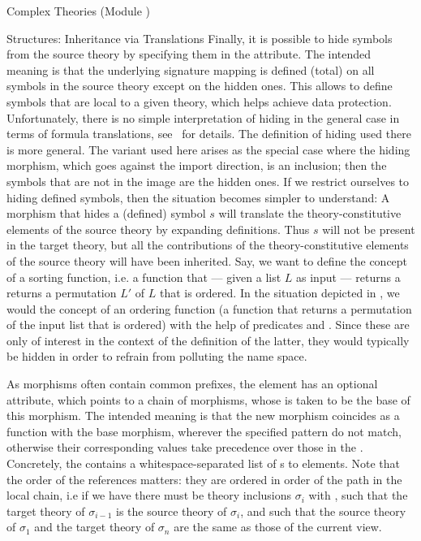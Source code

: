 \begin{tchapter}[id=complex-theories,short=Complex Theories]{Complex Theories (Module
    )}
\begin{tsection}[id=morphisms]{Structures: Inheritance via Translations}
Finally, it is possible to hide symbols from the source theory by specifying them in the
 attribute. The intended meaning is that the underlying
signature mapping is defined (total) on all symbols in the source theory except on the
hidden ones. This allows to define symbols that are local to a given theory, which helps
achieve data protection. Unfortunately, there is no simple interpretation of hiding in the
general case in terms of formula translations, see~\cite{CoFI:2004:CASL-RM,MAH-06-a} for
details. The definition of hiding used there is more general. The variant used here arises
as the special case where the hiding morphism, which goes against the import direction, is
an inclusion; then the symbols that are not in the image are the hidden ones.  If we
restrict ourselves to hiding defined symbols, then the situation becomes simpler to
understand: A morphism that hides a (defined) symbol $s$ will translate the
theory-constitutive elements of the source theory by expanding definitions. Thus $s$ will
not be present in the target theory, but all the contributions of the theory-constitutive
elements of the source theory will have been inherited. Say, we want to define the concept
of a sorting function, i.e. a function that --- given a list $L$ as input --- returns a
returns a permutation $L'$ of $L$ that is ordered. In the situation depicted in
, we would the concept of an ordering function (a function
that returns a permutation of the input list that is ordered) with the help of predicates
 and . Since these are only of interest in the context
of the definition of the latter, they would typically be hidden in order to refrain from
polluting the name space.

As morphisms often contain common prefixes, the  element has an optional
 attribute, which points to a chain of
morphisms, whose  is taken to be the base of
this morphism. The intended meaning is that the new morphism coincides as a function with
the base morphism, wherever the specified pattern do not match, otherwise their
corresponding values take precedence over those in the .
Concretely, the  contains a whitespace-separated list of
s to  elements. Note that the order of the
references matters: they are ordered in order of the path in the local chain, i.e if we
have  there must be theory
inclusions $\sigma_i$ with , such that the
target theory of $\sigma_{i-1}$ is the source theory of $\sigma_i$, and such that the
source theory of $\sigma_1$ and the target theory of $\sigma_n$ are the same as those of
the current view.


\end{tsection}
\end{tchapter}
